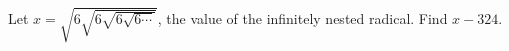 Let $x=\sqrt{6\sqrt{6\sqrt{6\sqrt{6\cdots}}}}$, the value of the infinitely nested radical. Find $x-324$.
